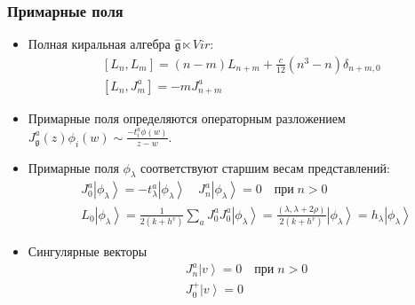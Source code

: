 \documentclass[pdftex]{beamer}
\newcommand{\gf}{\mathfrak{g}}
\newcommand{\gfh}{\hat{\mathfrak{g}}}
\theoremstyle{definition} \newtheorem{Def}{Definition}
\begin{document}
\begin{frame}
  \frametitle{Примарные поля}
  \begin{itemize}
  \item Полная киральная алгебра $\gfh \ltimes Vir$:
    \begin{equation}
      \label{eq:92}
      \begin{aligned}
        \left[L_n,L_m\right]=(n-m)L_{n+m}+\frac{c}{12}(n^3-n)\delta_{n+m,0}\\
        \left[L_n,J^a_m\right]=-mJ^a_{n+m}
      \end{aligned}
    \end{equation}
  \item Примарные поля определяются операторным разложением $J_{\gf}^{a}(z)\phi_{i}(w)\sim \frac{-t^{a}_{i}\phi(w)}{z-w}$.
  \item Примарные поля $\phi_{\lambda}$ соответствуют старшим весам представлений:
    \begin{equation*}
      \begin{aligned}
        & J_0^a\left|\phi_{\lambda}\right>=-t^a_{\lambda}\left|\phi_{\lambda}\right>  \quad    J^a_n\left|\phi_{\lambda}\right>=0 \quad \mbox{при}\; n>0 \\
        & L_0\left|\phi_{\lambda}\right>=\frac{1}{2(k+h^v)}\sum_aJ^a_0J^a_0\left|\phi_{\lambda}\right>=\frac{(\lambda,\lambda+2\rho)}{2(k+h^v)}\left|\phi_{\lambda}\right>=h_{\lambda} \left|\phi_{\lambda}\right>
      \end{aligned}
    \end{equation*}
  \item Сингулярные векторы 
    \begin{equation*}
    \begin{aligned}
      &J^a_n\left|v \right>=0 \quad \mbox{при}\; n>0 \\
      & J^{+}_{0} \left|v \right>=0
    \end{aligned}
    \end{equation*}
  \end{itemize}
\end{frame}
\end{document}
